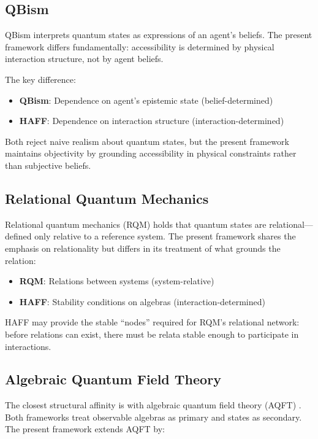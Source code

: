 \documentclass[12pt,a4paper]{article}
\begin{document}
\subsection{QBism}

QBism \cite{Fuchs2014} interprets quantum states as expressions of an agent's beliefs. The present framework differs fundamentally: accessibility is determined by physical interaction structure, not by agent beliefs.

The key difference:
\begin{itemize}
    \item \textbf{QBism}: Dependence on agent's epistemic state (belief-determined)
    \item \textbf{HAFF}: Dependence on interaction structure (interaction-determined)
\end{itemize}

Both reject naive realism about quantum states, but the present framework maintains objectivity by grounding accessibility in physical constraints rather than subjective beliefs.

\subsection{Relational Quantum Mechanics}

Relational quantum mechanics (RQM) \cite{Rovelli1996} holds that quantum states are relational---defined only relative to a reference system. The present framework shares the emphasis on relationality but differs in its treatment of what grounds the relation:

\begin{itemize}
    \item \textbf{RQM}: Relations between systems (system-relative)
    \item \textbf{HAFF}: Stability conditions on algebras (interaction-determined)
\end{itemize}

HAFF may provide the stable ``nodes'' required for RQM's relational network: before relations can exist, there must be relata stable enough to participate in interactions.

\subsection{Algebraic Quantum Field Theory}

The closest structural affinity is with algebraic quantum field theory (AQFT) \cite{Haag1996}. Both frameworks treat observable algebras as primary and states as secondary. The present framework extends AQFT by:
\end{document}
